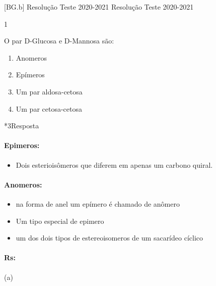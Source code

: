 \documentclass[\mainfilename]{subfiles}
\begin{document}
[BG.b]
{Resolução Teste 2020-2021}
{Resolução Teste 2020-2021}

\setcounter{question}{3}
\begin{questionBox}1{}
    
    O par D-Glucosa e D-Mannosa são:
    \begin{enumerate}[label={(\alph*)}]
        \item Anomeros
        \item Epímeros
        \item Um par aldosa-cetosa
        \item Um par cetosa-cetosa
    \end{enumerate}

    \begin{questionBox}*3{Resposta}
        
        \paragraph{Epimeros:}
        \begin{itemize}
            \item Dois esterioisômeros que diferem em apenas um carbono quiral.
        \end{itemize}
        \paragraph{Anomeros:}
        \begin{itemize}
            \item na forma de anel um epímero é chamado de anômero
            \item Um tipo especial de epimero
            \item um dos dois tipos de estereoisomeros de um sacarídeo cíclico
        \end{itemize}
        
    \end{questionBox}

    \paragraph{Rs:} (a)
    
\end{questionBox}
\end{document}
